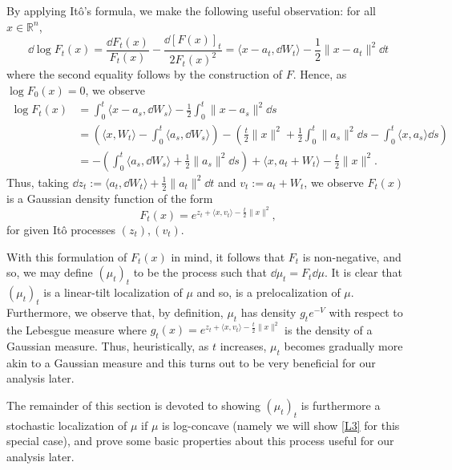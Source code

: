 By applying Itô's formula, we make the following useful observation: for all \(x \in \mathbb{R}^n\),
\begin{equation}
  \dd \log F_t(x) = \frac{\dd F_t(x)}{F_t(x)} - \frac{\dd\hspace{0pt} [F(x)]_t}{2F_t(x)^2} 
    = \langle x - a_t, \dd W_t \rangle - \frac{1}{2}\|x - a_t\|^2 \dd t
\end{equation}
where the second equality follows by the construction of \(F\). Hence, as \(\log F_0(x) = 0\), we 
observe
\begin{align*}
  \log F_t(x) & = \int_0^t \langle x - a_s, \dd W_s \rangle - \frac{1}{2}\int_0^t \|x - a_s\|^2 \dd s\\
    & = \left(\langle x, W_t \rangle - \int_0^t \langle a_s, \dd W_s \rangle\right)
      - \left(\frac{t}{2}\|x\|^2 + \frac{1}{2}\int_0^t\|a_s\|^2 \dd s - \int_0^t \langle x, a_s \rangle \dd s\right)\\
    & = - \left(\int_0^t \langle a_s, \dd W_s \rangle + \frac{1}{2}\|a_s\|^2 \dd s\right) + 
      \langle x, a_t + W_t \rangle - \frac{t}{2}\|x\|^2.
\end{align*}
Thus, taking \(\dd z_t := \langle a_t, \dd W_t\rangle + \frac{1}{2} \|a_t\|^2 \dd t\) and 
\(v_t := a_t + W_t\), we observe \(F_t(x)\) is a Gaussian density function of the form
\begin{equation}\label{eq:stoch_loc_alt}
  F_t(x) = e^{z_t + \langle x, v_t \rangle - \frac{t}{2}\|x\|^2},
\end{equation}
for given Itô processes \((z_t), (v_t)\).

With this formulation of \(F_t(x)\) in mind, it follows that \(F_t\) is non-negative, and so, 
we may define \((\mu_t)_t\) to be the process such that \(\dd \mu_t = F_t \dd \mu\). It is clear that 
\((\mu_t)_t\) is a linear-tilt localization of \(\mu\) and so, is a prelocalization of \(\mu\). 
Furthermore, we observe that, by definition, \(\mu_t\) has density \(g_t e^{-V}\) with respect 
to the Lebesgue measure where \(g_t(x) = e^{z_t + \langle x, v_t \rangle - \frac{t}{2}\|x\|^2}\) is the 
density of a Gaussian measure. Thus, heuristically, as \(t\) increases, \(\mu_t\) becomes gradually more 
akin to a Gaussian measure and this turns out to be very beneficial for our analysis later.

The remainder of this section is devoted to showing \((\mu_t)_t\) is furthermore a stochastic localization 
of \(\mu\) if \(\mu\) is log-concave (namely we will show \ref{L3} for this special case), and prove 
some basic properties about this process useful for our analysis later.


